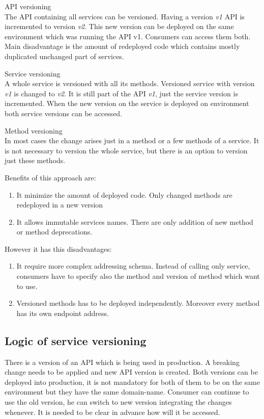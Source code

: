 \begin{description}
\item{API versioning} \\
The API containing all services can be versioned. Having a version \emph{v1} API is incremented to version \emph{v2}. This new version can be deployed on the same environment which was running the API v1. Consumers can access them both. Main disadvantage is the amount of redeployed code which contains mostly duplicated unchanged part of services. 
\item{Service versioning} \\
  A whole service is versioned with all its methods. Versioned service with version \emph{v1} is changed to \emph{v2}. It is still part of the API \emph{v1}, just the service version is incremented. When the new version on the service is deployed on environment both service versions can be accessed. 
\item{Method versioning} \\
  In most cases the change arises just in a method or a few methods of a service. It is not necessary to version the whole service, but there is an option to version just these methods. 
  
  Benefits of this approach are:
  
  \begin{enumerate}
    \item It minimize the amount of deployed code. Only changed methods are redeployed in a new version
    \item It allows immutable services names. There are only addition of new method or method deprecations.
  \end{enumerate}
  
  However it has this disadvantages:
  
  \begin{enumerate}
    \item It require more complex addressing schema. Instead of calling only service, consumers have to specify also the method and version of method which want to use.
    \item Versioned methods has to be deployed independently. Moreover every method has its own endpoint address.
  \end{enumerate}
\end{description}


\subsection{Logic of service versioning}
There is a version of an API which is being used in production. A breaking change needs to be applied and new API version is created. Both versions can be deployed into production, it is not mandatory for both of them to be on the same environment but they have the same \gls{domain-name}. Consumer can continue to use the old version, he can switch to new version integrating the changes whenever. It is needed to be clear in advance how will it be accessed.

